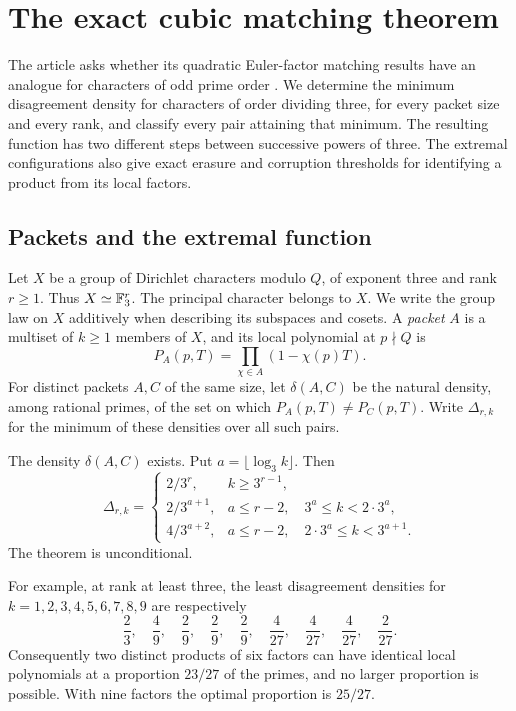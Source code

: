 \section{The exact cubic matching theorem}\label{sec:cubic}

The article asks whether its quadratic Euler-factor matching results have an
analogue for characters of odd prime order \cite{article}. We determine the
minimum disagreement density for characters of order dividing three, for every
packet size and every rank, and classify every pair attaining that minimum.
The resulting function has two different steps between successive powers of
three. The extremal configurations also give exact erasure and corruption
thresholds for identifying a product from its local factors.

\subsection{Packets and the extremal function}

Let $X$ be a group of Dirichlet characters modulo $Q$, of exponent three and
rank $r\geq1$. Thus $X\simeq\mathbb F_3^r$. The principal character belongs to $X$.
We write the group law on $X$ additively when describing its subspaces and
cosets. A \emph{packet} $A$ is a multiset of $k\geq1$ members of $X$, and its
local polynomial at $p\nmid Q$ is
\[
 P_A(p,T)=\prod_{\chi\in A}(1-\chi(p)T).
\]
For distinct packets $A,C$ of the same size, let $\delta(A,C)$ be the natural
density, among rational primes, of the set on which $P_A(p,T)\ne P_C(p,T)$.
Write $\Delta_{r,k}$ for the minimum of these densities over all such pairs.

\begin{theorem}\label{thm:cubic-min}
The density $\delta(A,C)$ exists. Put $a=\lfloor\log_3 k\rfloor$. Then
\begin{equation}\label{eq:cubic-min}
 \Delta_{r,k}=
 \begin{cases}
  2/3^r,&k\geq3^{r-1},\\[2pt]
  2/3^{a+1},&a\leq r-2,\quad 3^a\leq k<2\cdot3^a,\\[2pt]
  4/3^{a+2},&a\leq r-2,\quad 2\cdot3^a\leq k<3^{a+1}.
 \end{cases}
\end{equation}
The theorem is unconditional.
\end{theorem}

For example, at rank at least three, the least disagreement densities for
$k=1,2,3,4,5,6,7,8,9$ are respectively
\[
 \frac23,\quad\frac49,\quad\frac29,\quad\frac29,\quad\frac29,
 \quad\frac4{27},\quad\frac4{27},\quad\frac4{27},\quad\frac2{27}.
\]
Consequently two distinct products of six factors can have identical local
polynomials at a proportion $23/27$ of the primes, and no larger proportion
is possible. With nine factors the optimal proportion is $25/27$.

